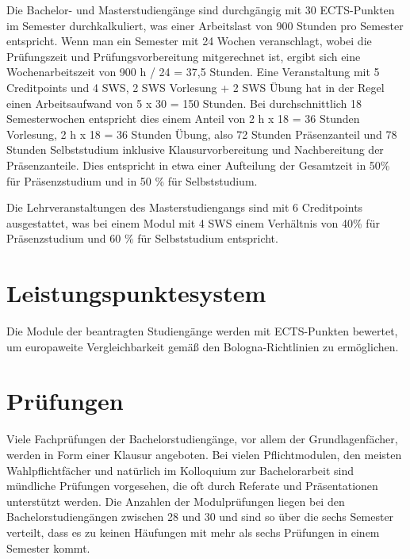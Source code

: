 Die Bachelor- und Masterstudiengänge sind durchgängig mit 30
ECTS-Punkten im Semester durchkalkuliert, was einer Arbeitslast von 900
Stunden pro Semester entspricht. Wenn man ein Semester mit 24 Wochen
veranschlagt, wobei die Prüfungszeit und Prüfungsvorbereitung
mitgerechnet ist, ergibt sich eine Wochenarbeitszeit von 900 h / 24 =
37,5 Stunden. Eine Veranstaltung mit 5 Creditpoints und 4 SWS, 2 SWS
Vorlesung + 2 SWS Übung hat in der Regel einen Arbeitsaufwand von 5 x 30
= 150 Stunden. Bei durchschnittlich 18 Semesterwochen entspricht dies
einem Anteil von 2 h x 18 = 36 Stunden Vorlesung, 2 h x 18 = 36 Stunden
Übung, also 72 Stunden Präsenzanteil und 78 Stunden Selbststudium
inklusive Klausurvorbereitung und Nachbereitung der Präsenzanteile. Dies
entspricht in etwa einer Aufteilung der Gesamtzeit in 50\% für
Präsenzstudium und in 50 \% für Selbststudium.

Die Lehrveranstaltungen des Masterstudiengangs sind mit 6 Creditpoints
ausgestattet, was bei einem Modul mit 4 SWS einem Verhältnis von 40\%
für Präsenzstudium und 60 \% für Selbststudium entspricht.

\section{Leistungspunktesystem\label{/mi-2017/selbstbericht/0500-studierbarkeit/0000-studierbarkeit}}\label{leistungspunktesystempathlabelmi-2017selbstbericht0500-studierbarkeit0000-studierbarkeit}

Die Module der beantragten Studiengänge werden mit ECTS-Punkten
bewertet, um europaweite Vergleichbarkeit gemäß den Bologna-Richtlinien
zu ermöglichen.

\section{Prüfungen\label{/mi-2017/selbstbericht/0500-studierbarkeit/0000-studierbarkeit}}\label{pruxfcfungenpathlabelmi-2017selbstbericht0500-studierbarkeit0000-studierbarkeit}

Viele Fachprüfungen der Bachelorstudiengänge, vor allem der
Grundlagenfächer, werden in Form einer Klausur angeboten. Bei vielen
Pflichtmodulen, den meisten Wahlpflichtfächer und natürlich im
Kolloquium zur Bachelorarbeit sind mündliche Prüfungen vorgesehen, die
oft durch Referate und Präsentationen unterstützt werden. Die Anzahlen
der Modulprüfungen liegen bei den Bachelorstudiengängen zwischen 28 und
30 und sind so über die sechs Semester verteilt, dass es zu keinen
Häufungen mit mehr als sechs Prüfungen in einem Semester kommt.

